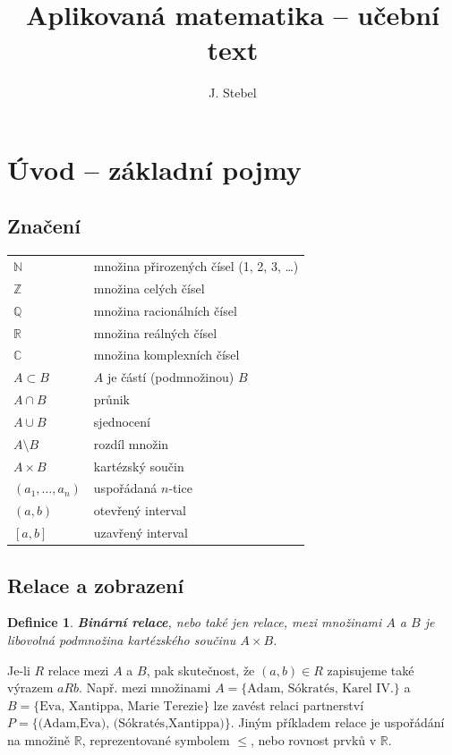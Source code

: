 \documentclass{article}
\title{Aplikovaná matematika -- učební text}
\author{J. Stebel}
\newtheorem{df}{Definice}
\newcommand{\0}{\vec{0}}
\newcommand{\C}{\mathbb C}
\newcommand{\N}{\mathbb N}
\newcommand{\Q}{\mathbb Q}
\newcommand{\R}{\mathbb R}
\newcommand{\Z}{\mathbb Z}
\begin{document}
\maketitle

\section{Úvod -- základní pojmy}

\subsection{Značení}

\begin{tabular}{ll}
$\N$ & množina přirozených čísel (1, 2, 3, \ldots)\\
$\Z$ & množina celých čísel\\
$\Q$ & množina racionálních čísel\\
$\R$ & množina reálných čísel\\
$\C$ & množina komplexních čísel\\
$A\subset B$ & $A$ je částí (podmnožinou) $B$\\
$A\cap B$ & průnik\\
$A\cup B$ & sjednocení\\
$A\setminus B$ & rozdíl množin\\
$A\times B$ & kartézský součin\\
$(a_1,\ldots,a_n)$ & uspořádaná $n$-tice\\
$(a,b)$ & otevřený interval\\
$[a,b]$ & uzavřený interval
\end{tabular}



\subsection{Relace a zobrazení}

\begin{df} {\bf Binární relace}, nebo také jen relace, mezi množinami $A$ a $B$ je libovolná podmnožina kartézského součinu $A\times B$.
\end{df}
Je-li $R$ relace mezi $A$ a $B$, pak skutečnost, že $(a,b)\in R$ zapisujeme také výrazem $aRb$.
Např. mezi množinami $A=\{\mbox{Adam, Sókratés, Karel IV.}\}$ a $B=\{\mbox{Eva, Xantippa, Marie Terezie}\}$ lze zavést relaci partnerství $P=\{\mbox{(Adam,Eva), (Sókratés,Xantippa)}\}$.
Jiným příkladem relace je uspořádání na množině $\R$, reprezentované symbolem $\le$, nebo rovnost prvků v $\R$.
\end{document}
